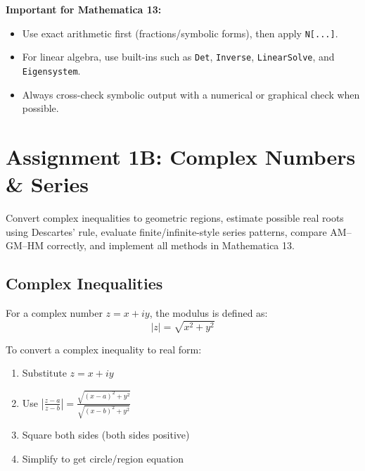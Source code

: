 \documentclass[12pt,a4paper]{article}
\begin{document}
\begin{tipbox}
    \textbf{Important for Mathematica 13:}
    \begin{itemize}
        \item Use exact arithmetic first (fractions/symbolic forms), then apply \texttt{N[...]}.
        \item For linear algebra, use built-ins such as \texttt{Det}, \texttt{Inverse}, \texttt{LinearSolve}, and \texttt{Eigensystem}.
        \item Always cross-check symbolic output with a numerical or graphical check when possible.
    \end{itemize}
\end{tipbox}
\newpage

\section{Assignment 1B: Complex Numbers \& Series}

\begin{definitionbox}
    Convert complex inequalities to geometric regions, estimate possible real roots using Descartes' rule,
    evaluate finite/infinite-style series patterns, compare AM--GM--HM correctly, and implement all methods in Mathematica 13.
\end{definitionbox}

\subsection{Complex Inequalities}

\begin{definitionbox}
    For a complex number \(z = x + iy\), the modulus is defined as:
    \[ |z| = \sqrt{x^2 + y^2} \]
    
    To convert a complex inequality to real form:
    \begin{enumerate}
        \item Substitute \(z = x + iy\)
        \item Use \( \left| \frac{z - a}{z - b} \right| = \frac{\sqrt{(x-a)^2 + y^2}}{\sqrt{(x-b)^2 + y^2}} \)
        \item Square both sides (both sides positive)
        \item Simplify to get circle/region equation
    \end{enumerate}
\end{definitionbox}
\end{document}

